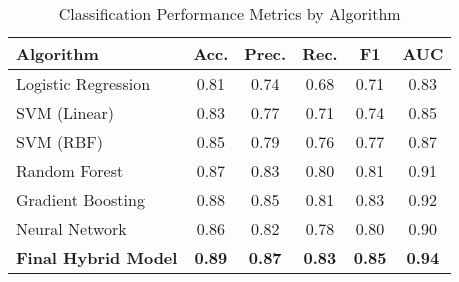 \begin{table}[h]
\caption{Classification Performance Metrics by Algorithm}
\label{table:classification}
\begin{center}
\begin{tabular}{|l|c|c|c|c|c|}
\hline
\textbf{Algorithm} & \textbf{Acc.} & \textbf{Prec.} & \textbf{Rec.} & \textbf{F1} & \textbf{AUC} \\
\hline
Logistic Regression & 0.81 & 0.74 & 0.68 & 0.71 & 0.83 \\
\hline
SVM (Linear) & 0.83 & 0.77 & 0.71 & 0.74 & 0.85 \\
\hline
SVM (RBF) & 0.85 & 0.79 & 0.76 & 0.77 & 0.87 \\
\hline
Random Forest & 0.87 & 0.83 & 0.80 & 0.81 & 0.91 \\
\hline
Gradient Boosting & 0.88 & 0.85 & 0.81 & 0.83 & 0.92 \\
\hline
Neural Network & 0.86 & 0.82 & 0.78 & 0.80 & 0.90 \\
\hline
\textbf{Final Hybrid Model} & \textbf{0.89} & \textbf{0.87} & \textbf{0.83} & \textbf{0.85} & \textbf{0.94} \\
\hline
\end{tabular}
\end{center}
\end{table}